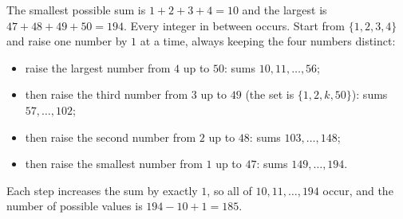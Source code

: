 The smallest possible sum is $1+2+3+4=10$ and the largest is $47+48+49+50=194$. Every integer in between occurs. Start from $\{1,2,3,4\}$ and raise one number by $1$ at a time, always keeping the four numbers distinct:
\begin{itemize}
\item raise the largest number from $4$ up to $50$: sums $10,11,\dots,56$;
\item then raise the third number from $3$ up to $49$ (the set is $\{1,2,k,50\}$): sums $57,\dots,102$;
\item then raise the second number from $2$ up to $48$: sums $103,\dots,148$;
\item then raise the smallest number from $1$ up to $47$: sums $149,\dots,194$.
\end{itemize}
Each step increases the sum by exactly $1$, so all of $10,11,\dots,194$ occur, and the number of possible values is $194-10+1=\boxed{185}$.
